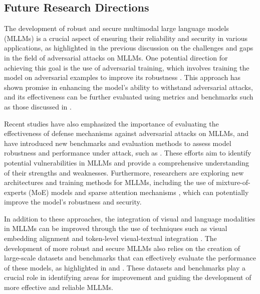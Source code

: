 \documentclass[11pt,a4paper]{article}
\begin{document}
\subsection{Future Research Directions}


The development of robust and secure multimodal large language models (MLLMs) is a crucial aspect of ensuring their reliability and security in various applications, as highlighted in the previous discussion on the challenges and gaps in the field of adversarial attacks on MLLMs. One potential direction for achieving this goal is the use of adversarial training, which involves training the model on adversarial examples to improve its robustness \cite{arxiv:2109.12178}. This approach has shown promise in enhancing the model's ability to withstand adversarial attacks, and its effectiveness can be further evaluated using metrics and benchmarks such as those discussed in \cite{arxiv:2408.15769}.

Recent studies have also emphasized the importance of evaluating the effectiveness of defense mechanisms against adversarial attacks on MLLMs, and have introduced new benchmarks and evaluation methods to assess model robustness and performance under attack, such as \cite{arxiv:2407.15272}. These efforts aim to identify potential vulnerabilities in MLLMs and provide a comprehensive understanding of their strengths and weaknesses. Furthermore, researchers are exploring new architectures and training methods for MLLMs, including the use of mixture-of-experts (MoE) models \cite{arxiv:2407.12709} and sparse attention mechanisms \cite{arxiv:2410.13859}, which can potentially improve the model's robustness and security.

In addition to these approaches, the integration of visual and language modalities in MLLMs can be improved through the use of techniques such as visual embedding alignment \cite{arxiv:2410.07167} and token-level visual-textual integration \cite{arxiv:2408.11813}. The development of more robust and secure MLLMs also relies on the creation of large-scale datasets and benchmarks that can effectively evaluate the performance of these models, as highlighted in \cite{arxiv:2401.13601} and \cite{arxiv:2408.08632}. These datasets and benchmarks play a crucial role in identifying areas for improvement and guiding the development of more effective and reliable MLLMs.
\end{document}
